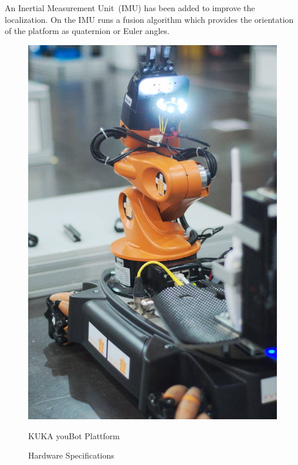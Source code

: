 An Inertial Measurement Unit~(IMU) has been added to improve the localization. 
On the IMU runs a fusion algorithm which provides the orientation of the platform as quaternion or Euler angles.


\begin{figure}[htbp]
	\begin{minipage}{0.45\textwidth}
		\includegraphics[width=\textwidth]{img/YoubotInAction.jpg}
		\caption{KUKA youBot Plattform}
		\label{fig:youBot}
	\end{minipage}
	\hfill
	\begin{minipage}{0.45\textwidth}
	\renewcommand*\figurename{Tab.}
	\setcounter{figure}{0}
	\centering
			\label{tab:hw}
			\caption{Hardware Specifications}
			

\end{minipage}
\end{figure}
